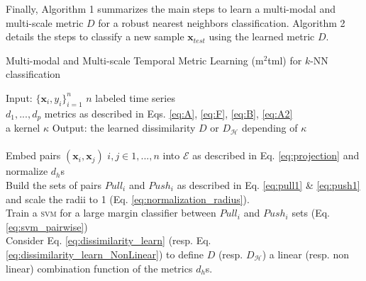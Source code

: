 \noindent Finally, Algorithm 1 summarizes the main steps to learn a multi-modal and multi-scale metric $D$ for a robust nearest neighbors classification. Algorithm 2 details the steps to classify a new sample $\textbf{x}_{test}$ using the learned metric $D$.
\begin{algorithm}[h!]
	\begin{algorithmic}[1]
		\caption{Multi-modal and Multi-scale Temporal Metric Learning ({\sc m}$^2${\sc tml}) for $k$-NN classification}
		\label{algo:MMTML}
		\STATE Input:  
		$\{\textbf{x}_i, y_i\}_{i=1}^n$ $n$ labeled time series \\ \hspace{1.1cm} $d_1, ...,d_p$  metrics as described in Eqs. \ref{eq:A}, \ref{eq:F}, \ref{eq:B}, \ref{eq:A2} \\
		\hspace{1.1cm} a kernel $\kappa$
		\STATE Output:  the learned dissimilarity $D$ or $D_{\mathcal{H}}$ depending of $\kappa$ \\
		 \\   
		Embed pairs $(\textbf{x}_i,\textbf{x}_j)$ $i,j \in {1,...,n}$ into $\mathcal{E}$ as described in Eq. \ref{eq:projection} and normalize $d_h$s
		 \\   
		Build the sets of pairs $Pull_i$ and $Push_i$ as described in Eq. \ref{eq:pull1} \& \ref{eq:push1} and scale the radii to 1 (Eq. \ref{eq:normalization_radius}).
		 \\   
		Train a \textsc{svm} for a large margin classifier between  $Pull_i$ and $Push_i$ sets (Eq. \ref{eq:svm_pairwise})
		 \\ 
		Consider Eq. \ref{eq:dissimilarity_learn} (resp. Eq. \ref{eq:dissimilarity_learn_NonLinear}) to define $D$ (resp. $D_{\mathcal{H}}$) a linear (resp. non linear) combination function of the metrics $d_h$s.
	\end{algorithmic}
\end{algorithm}


